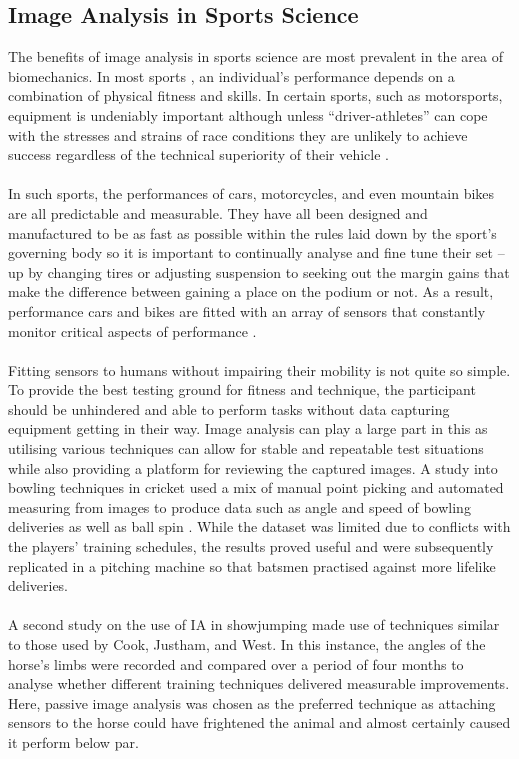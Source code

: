 \subsection{Image Analysis in Sports Science}
	The benefits of image analysis in sports science are most prevalent in the area of biomechanics. In most sports , an individual’s performance depends on a combination of physical fitness and skills. In certain sports, such as motorsports, equipment is undeniably important although unless “driver-athletes” can cope with the stresses and strains of race conditions they are unlikely to achieve success regardless of the technical superiority of their vehicle \citep{klarica2001performance}.
	\\\\
	In such sports, the performances of cars, motorcycles, and even mountain bikes are all predictable and measurable. They have all been designed and manufactured to be as fast as possible within the rules laid down by the sport’s governing body so it is important to continually analyse and fine tune their set – up by changing tires or adjusting suspension to seeking out the margin gains that make the difference between gaining a place on the podium or not. As a result, performance cars and bikes are fitted with an array of sensors that constantly monitor critical aspects of performance \citep{segers2008analysis}. 
	\\\\
	Fitting sensors to humans without impairing their mobility is not quite so simple. To provide the best testing ground for fitness and technique, the participant should be unhindered and able to perform tasks without data capturing equipment getting in their way. Image analysis can play a large part in this as utilising various techniques can allow for stable and repeatable test situations while also providing a platform for reviewing the captured images. A study into bowling techniques in cricket used a mix of manual point picking and automated measuring from images to produce data such as angle and speed of bowling deliveries as well as ball spin \citep{cricketimaging}. While the dataset was limited due to conflicts with the players’ training schedules, the results proved useful and were subsequently replicated in a pitching machine so that batsmen practised against more lifelike deliveries.
	\\\\
	A second study on the use of IA in showjumping \citep{jumpyhorses} made use of techniques similar to those used by Cook, Justham, and West. In this instance, the angles of the horse’s limbs were recorded and compared over a period of four months to analyse whether different training techniques delivered measurable improvements. Here, passive image analysis was chosen as the preferred technique as attaching sensors to the horse could have frightened the animal and almost certainly caused it perform below par.